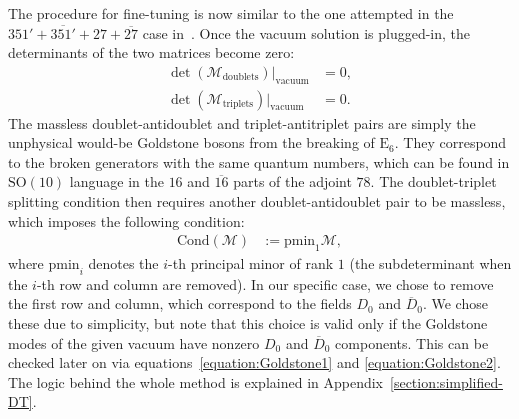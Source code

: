 \documentclass[a4paper,12pt]{article}
\def\SO{\mathrm{SO}}
\def\EE{\mathrm{E}_6}
\begin{document}
The procedure for fine-tuning is now similar to the one attempted in the $351'+\overline{351'}+27+\overline{27}$ case in~\cite{Bajc:2013qra}. Once the vacuum solution is plugged-in, the determinants of the two matrices become zero:
\begin{align}
\det(\mathcal{M}_{\textrm{doublets}})\Big|_{\textrm{vacuum}}&=0,\\
\det(\mathcal{M}_{\textrm{triplets}})\Big|_{\textrm{vacuum}}&=0.
\end{align}
The massless doublet-antidoublet and triplet-antitriplet pairs are simply the unphysical would-be Goldstone bosons from the breaking of $\EE$. They correspond to the broken generators with the same quantum numbers, which can be found in $\SO(10)$ language in the $16$ and $\overline{16}$ parts of the adjoint $78$. The doublet-triplet splitting condition then requires another doublet-antidoublet pair to be massless, which imposes the following condition:
\begin{align}
\mathrm{Cond}(\mathcal{M})&:=\mathrm{pmin}_1 \mathcal{M},
\end{align}
where $\mathrm{pmin}_i$ denotes the $i$-th principal minor of rank $1$ (the subdeterminant when the $i$-th row and column are removed). In our specific case, we chose to remove the first row and column, which correspond to the fields $D_0$ and $\overline{D}_0$. We chose these due to simplicity, but note that this choice is valid only if the Goldstone modes of the given vacuum have nonzero $D_0$ and $\overline{D}_0$ components. This can be checked later on via equations~\eqref{equation:Goldstone1} and \eqref{equation:Goldstone2}. The logic behind the whole method is explained in Appendix~\ref{section:simplified-DT}.
\end{document}
